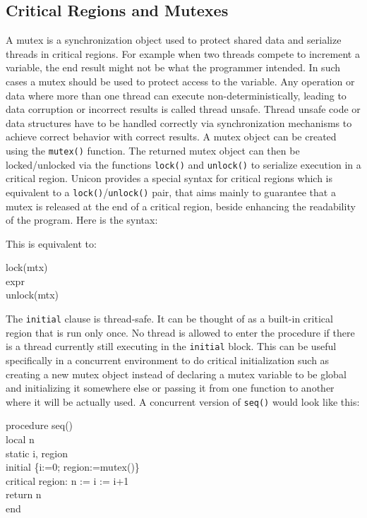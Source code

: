 \subsection{Critical Regions and Mutexes}
A mutex is a synchronization object used to protect shared data and
serialize threads in critical regions. For example when two threads compete
to increment a variable, the end result might not be what the programmer
intended. In such cases a mutex should be used to protect access to the
variable. Any operation or data where more than one thread can execute
non-deterministically, leading to data corruption or incorrect results is
called thread unsafe. Thread unsafe code or data structures have to be
handled correctly via synchronization mechanisms to achieve correct
behavior with correct results.  A mutex object can be created using the
\texttt{mutex()} function. The returned mutex object can then be
locked/unlocked via the functions \texttt{lock()} and \texttt{unlock()} to
serialize execution in a critical region. Unicon provides a special syntax
for critical regions which is equivalent to a
\texttt{lock()}/\texttt{unlock()} pair, that aims mainly to guarantee that
a mutex is released at the end of a critical region, beside enhancing the
readability of the program. Here is the syntax:


\noindent
This is equivalent to:

\begin{iconcode}
lock(mtx)\\
expr\\
unlock(mtx)\\
\end{iconcode}

The \texttt{initial} clause is thread-safe. It can be thought of as a
built-in critical region that is run only once. No thread is allowed to
enter the procedure if there is a thread currently still executing in the
\texttt{initial} block. This can be useful specifically in a concurrent
environment to do critical initialization such as creating a new mutex
object instead of declaring a mutex variable to be global and initializing
it somewhere else or passing it from one function to another where it will
be actually used. A concurrent version of \texttt{seq()} would look like
this:

\begin{iconcode}
procedure seq()\\
\>local n\\
\>static i, region\\
\>initial \{i:=0; region:=mutex()\}\\
\>critical region: n := i := i+1\\
\>return n\\
end \\
\end{iconcode}

